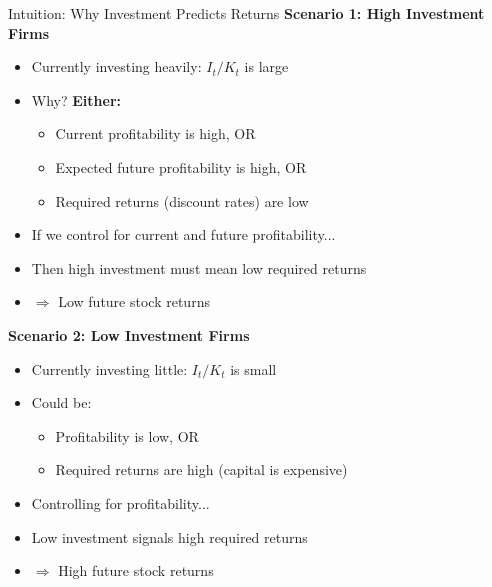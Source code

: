 \documentclass{beamer}
\begin{document}
\begin{frame}{Intuition: Why Investment Predicts Returns}
    \textbf{Scenario 1: High Investment Firms}
    \begin{itemize}
        \item Currently investing heavily: $I_t/K_t$ is large
        \item Why? \textbf{Either:}
        \begin{itemize}
            \item Current profitability is high, OR
            \item Expected future profitability is high, OR
            \item Required returns (discount rates) are low
        \end{itemize}
        \item If we control for current and future profitability...
        \item Then high investment must mean low required returns
        \item $\Rightarrow$ Low future stock returns
    \end{itemize}
    
    
    \textbf{Scenario 2: Low Investment Firms}
    \begin{itemize}
        \item Currently investing little: $I_t/K_t$ is small
        \item Could be:
        \begin{itemize}
            \item Profitability is low, OR
            \item Required returns are high (capital is expensive)
        \end{itemize}
        \item Controlling for profitability...
        \item Low investment signals high required returns
        \item $\Rightarrow$ High future stock returns
    \end{itemize}
\end{frame}
\end{document}
